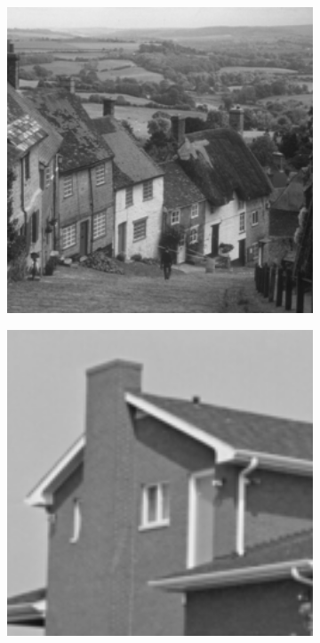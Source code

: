 \begin{figure}
\begin{subfigure}[b]{0.09\textwidth}
    \end{subfigure}
    \hfill
    \begin{subfigure}[b]{0.09\textwidth}
        \centering
        \includegraphics[width=1\textwidth]{images/pgpd/hill.png}
    \end{subfigure}
    \hfill
    \begin{subfigure}[b]{0.09\textwidth}
        \centering
        \includegraphics[width=1\textwidth]{images/pgpd/house.png}

\end{subfigure}
\end{figure}
